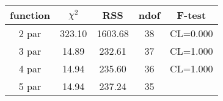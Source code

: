 \begin{tabular}{c|c|c|c|c}
function & $\chi^2$ & RSS & ndof & F-test \\
\hline
2 par & 323.10 & 1603.68 & 38 & CL=0.000 \\
3 par & 14.89 & 232.61 & 37 & CL=1.000 \\
4 par & 14.94 & 235.60 & 36 & CL=1.000 \\
5 par & 14.94 & 237.24 & 35 & \\
\hline
\end{tabular}